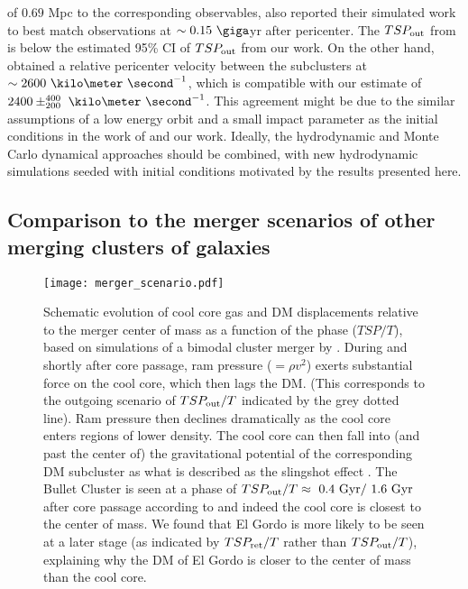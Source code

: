 of $0.69$ Mpc to the corresponding observables, \cite{Donnert13} also reported their simulated work 
to best match  observations at $\sim 0.15~\giga$yr after pericenter. 
The $TSP_{\rm out}$ from \cite{Donnert13} is below the estimated 95\% CI of
$TSP_{\rm out}$ from our work.
On the other hand, \cite{Donnert13} obtained a
relative pericenter velocity between the subclusters at $\sim
2600~\kilo\meter~\second^{-1}$, which is compatible with our estimate of
$2400\pm^{400}_{200}~\kilo\meter~\second^{-1}$.  
This agreement might be due to the similar assumptions of a low
energy orbit and a small impact parameter as the initial conditions in the
work of \cite{Donnert13} and our work. 
Ideally, the hydrodynamic and Monte Carlo dynamical approaches should be combined, with new hydrodynamic simulations seeded with initial conditions motivated by the results presented here.


\subsection{Comparison to the merger scenarios of other merging clusters of galaxies}

\begin{figure}
	\texttt{[image: merger\_scenario.pdf]}
 \caption{Schematic evolution of cool core gas and DM displacements relative to the
merger center of mass as a function of the phase ($TSP / T$), based on
simulations of a bimodal cluster merger by \citet{Mathis05}. During and
shortly after core passage, ram pressure ($=\rho v^2$) exerts substantial
force on the cool core, which then lags the DM. (This corresponds to the
outgoing scenario of $TSP_{\rm out} / T$ indicated by the grey dotted line). Ram
pressure then declines dramatically as the cool core enters regions of
lower density.  The cool core can then fall into (and past the center of)
the gravitational potential of the corresponding DM subcluster as what is
described as the slingshot effect \citep{Markevitch2007}.  The Bullet
Cluster is seen at a phase of $TSP_{\rm out} / T \approx ~0.4\text{ Gyr} / ~1.6
\text{ Gyr}$ after core passage according
to  and indeed the cool core is closest to the center of
mass. We found that El Gordo is more likely to be seen at a later stage (as
indicated by $TSP_{\rm ret} / T$ rather than $TSP_{\rm out} / T$), explaining why the DM of
El Gordo is closer to the center of mass than the cool core. \label{fig:merger_scenario}}
\end{figure}
	
